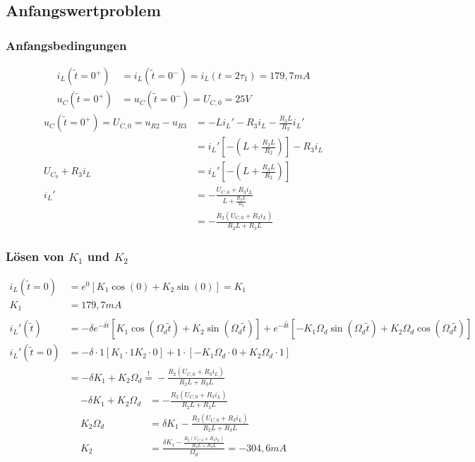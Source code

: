 \documentclass[11pt]{scrartcl}
\begin{document}
\subsection{Anfangswertproblem}%
\subsubsection{Anfangsbedingungen}%
\begin{align*}
  i_{L}(\tilde{t} = 0^{+}) &= i_{L}(\tilde{t} = 0^{-}) = i_{L}(t=2\tau_{1}) = 179,7 \unit{mA} \\
  u_{C}(\tilde{t} = 0^{+}) &= u_{C}(\tilde{t} = 0^{-}) = U_{C,0} = 25 \unit{V}
\end{align*}
\begin{align*}
  u_{C}(\tilde{t} = 0^{+})=U_{C,0} = u_{R2} -u_{R3} &= -L i_{L}' -R_{3}i_{L}-\frac{R_{3}L}{R_{2}} i_{L}' \\
                                            &= i_{L}' \left[ -\left( L +    \frac{R_{3}L}{R_{2}}\right)\right] - R_{3}i_{L} \\
  U_{C_{0}} + R_{3}i_{L} &= i_{L}'\left[ -\left( L + \frac{R_{3}L}{R_{2}}\right)\right] \\
  i_{L}' &= - \frac{U_{C,0} + R_{3}i_{L}}{L + \frac{R_{3}L}{R_{2}}} \\
        &= - \frac{R_{2} (U_{C,0} + R_{3} i_{L})}{R_{2}L + R_{3}L}
\end{align*}

\subsubsection{Lösen von $K_1$ und $K_2$}%
\begin{align*}
  i_{L}(\tilde{t} = 0) &= e^{0} \left[ K_{1} \cos(0) + K_{2} \sin(0)\right] = K_{1} \\
  K_{1} &= 179,7 \unit{mA} \\ \\
  i_{L}'(\tilde{t}) &= -\delta e^{-\delta \tilde{t}} \left[ K_{1} \cos(\Omega_{d} \tilde{t}) + K_{2} \sin(\Omega_{d} \tilde{t})\right] + e^{-\delta \tilde{t}} \left[ -K_{1} \Omega_{d} \sin(\Omega_{d} \tilde{t}) + K_{2} \Omega_{d} \cos(\Omega_{d} \tilde{t})\right] \\
  i_{L}'(\tilde{t}=0) &= -\delta\cdot 1 \left[ K_{1}\cdot 1 K_{2} \cdot 0\right] + 1 \cdot \left[ -K_{1}\Omega_{d} \cdot 0 + K_{2} \Omega_{d} \cdot 1\right] \\
  &= -\delta K_{1} + K_{2}\Omega_{d} \overset{!}{=} - \frac{R_{2} (U_{C,0} + R_{3} i_{L})}{R_{2}L + R_{3}L}
\end{align*}
\begin{align*}
  -\delta K_{1} + K_{2}\Omega_{d} &= - \frac{R_{2} (U_{C,0} + R_{3} i_{L})}{R_{2}L + R_{3}L} \\
  K_{2}\Omega_{d} &= \delta K_{1} - \frac{R_{2}(U_{C,0} + R_{3}i_{L})}{R_{2}L + R_{3}L} \\
  K_{2} &= \frac{\delta K_{1} - \frac{R_{2}(U_{C,0} + R_{3} i_{L})}{R_{2}L + R_{3}L}}{\Omega_{d}} = -304,6 \unit{mA}
\end{align*}
\end{document}
